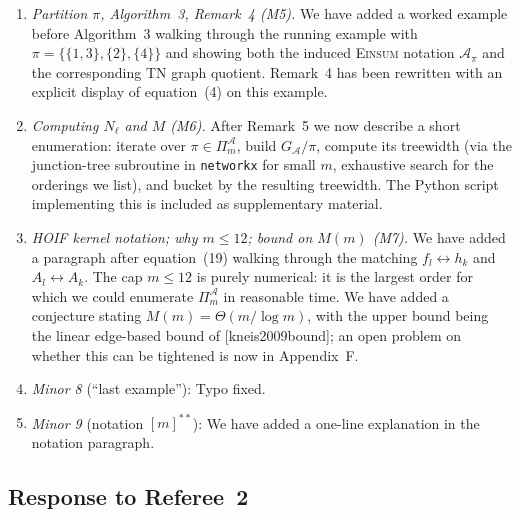 \documentclass[11pt]{article}
\newcommand{\Einsum}{\textsc{Einsum}}
\newcommand{\calA}{\mathcal{A}}
\providecommand{\citet}[1]{[#1]}
\theoremstyle{plain}
\theoremstyle{definition}
\begin{document}
\begin{enumerate}[leftmargin=2.4em,label=\textbf{(\arabic*)}]
\item \emph{Partition $\pi$, Algorithm~3, Remark~4 (M5).}
We have added a worked example before Algorithm~3 walking through the
running example with $\pi=\{\{1,3\},\{2\},\{4\}\}$ and showing both the
induced \Einsum{} notation $\calA_\pi$ and the corresponding TN graph
quotient.  Remark~4 has been rewritten with an explicit display of
equation~(4) on this example.

\item \emph{Computing $N_\ell$ and $M$ (M6).}
After Remark~5 we now describe a short enumeration: iterate over
$\pi\in\Pi_m^\calA$, build $G_\calA/\pi$, compute its treewidth (via
the junction-tree subroutine in \texttt{networkx} for small $m$, exhaustive
search for the orderings we list), and bucket by the resulting treewidth.
The Python script implementing this is included as supplementary
material.

\item \emph{HOIF kernel notation; why $m\leq 12$; bound on $M(m)$ (M7).}
We have added a paragraph after equation~(19) walking through the
matching $f_l\leftrightarrow h_k$ and $A_l\leftrightarrow A_k$.  The cap
$m\leq 12$ is purely numerical: it is the largest order for which we
could enumerate $\Pi_m^\calA$ in reasonable time.  We have added a
conjecture stating $M(m)=\Theta(m/\log m)$, with the upper bound being
the linear edge-based bound of \citet{kneis2009bound}; an open problem
on whether this can be tightened is now in Appendix~F.

\item \emph{Minor 8} (``last example''): Typo fixed.

\item \emph{Minor 9} (notation $[m]^{**}$): We have added a one-line
explanation in the notation paragraph.
\end{enumerate}

\subsection*{Response to Referee~2}
\end{document}
